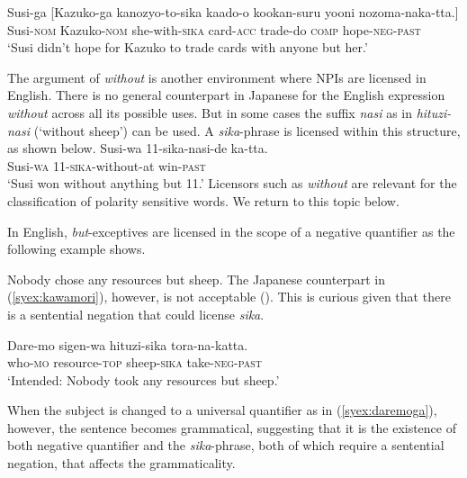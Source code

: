 \documentclass[output=paper,colorlinks,citecolor=brown,
]{langscibook}
\def\M#1{\textsc{#1}}
\begin{document}

\ea \gll Susi-ga [Kazuko-ga kanozyo-to-sika kaado-o kookan-suru yooni nozoma-naka-tta.]\\
Susi-\M{nom} Kazuko-\M{nom} she-with-\M{sika} card-\M{acc} trade-do \M{comp} hope-\M{neg}-\M{past}\\
\glt `Susi didn't hope for Kazuko to trade cards with anyone but her.'\z


The argument of \emph{without} is another environment where NPIs are licensed in English.
There is no general counterpart in Japanese for the English expression \textit{without} across all its possible uses.  But in some cases the suffix \emph{nasi} as in \emph{hituzi-nasi} (`without sheep') can be used.  A \emph{sika}-phrase is licensed within this structure, as shown below.
\ea \label{syex:nasi}
    \gll Susi-wa 11-sika-nasi-de ka-tta.\\
        Susi-\M{wa} 11-\M{sika}-without-at  win-\M{past}\\
    \glt    `Susi won without anything but 11.'\z
%       
Licensors such as \emph{without} are relevant for the classification of polarity sensitive words.  We return to this topic below.

In English, \emph{but}-exceptives are licensed in the scope of a negative quantifier as the following example shows. 

\ea Nobody chose any resources but sheep.\z
%
The Japanese counterpart in (\ref{syex:kawamori}), however, is not acceptable (\citealt{kawamori01a}). This is curious given that there is a sentential negation that could license \emph{sika}. 

\ea \label{syex:kawamori}
\gll *Dare-mo sigen-wa hituzi-sika tora-na-katta.\\
who-\M{mo} resource-\M{top} sheep-\M{sika} take-\M{neg-past}\\
\glt `Intended: Nobody took any resources but sheep.' \z

When the subject is changed to a universal quantifier as in (\ref{syex:daremoga}), however, the sentence becomes grammatical, suggesting that it is the existence of both negative quantifier and the \emph{sika}-phrase, both of which require a sentential negation, that affects the grammaticality.
\end{document}
